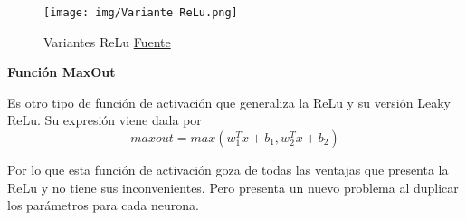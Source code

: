         \begin{figure}[H]
            \centering
            \texttt{[image: img/Variante ReLu.png]}
            \caption{Variantes ReLu \href{https://www.researchgate.net/profile/Alberto-Marchisio/publication/328878703/figure/fig2/AS:691988286423047@1541994272922/Behavior-of-ReLU-ELU-and-SELU-activation-functions.ppm}{Fuente}}
            \label{fig:grafica variante relu}
        \end{figure}
    
    
    
    \begin{center}
        \textbf{Función MaxOut} \\
    \end{center}
    
    Es otro tipo de función de activación que generaliza la ReLu y su versión Leaky ReLu. Su expresión viene dada por 
    \begin{equation}
        maxout = max(w^T_1x+b_1,w^T_2x+b_2)
    \end{equation}
    
    \noindent Por lo que esta función de activación goza de todas las ventajas que presenta la ReLu y no tiene sus inconvenientes. Pero presenta un nuevo problema al duplicar los parámetros para cada neurona. 
    



\endinput

